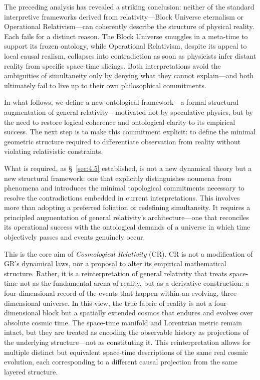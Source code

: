 \documentclass[12pt]{book}
\begin{document}
\vspace{4pt}

The preceding analysis has revealed a striking conclusion: neither of the standard interpretive frameworks derived from relativity---Block Universe eternalism or Operational Relativism---can coherently describe the structure of physical reality. Each fails for a distinct reason. The Block Universe smuggles in a meta-time to support its frozen ontology, while Operational Relativism, despite its appeal to local causal realism, collapses into contradiction as soon as physicists infer distant reality from specific space-time slicings. Both interpretations avoid the ambiguities of simultaneity only by denying what they cannot explain---and both ultimately fail to live up to their own philosophical commitments.

In what follows, we define a new ontological framework---a formal structural augmentation of general relativity---motivated not by speculative physics, but by the need to restore logical coherence and ontological clarity to its empirical success. The next step is to make this commitment explicit: to define the minimal geometric structure required to differentiate observation from reality without violating relativistic constraints.

What is required, as \S~\ref{sec:4.5} established, is not a new dynamical theory but a new structural framework: one that explicitly distinguishes noumena from phenomena and introduces the minimal topological commitments necessary to resolve the contradictions embedded in current interpretations. This involves more than adopting a preferred foliation or redefining simultaneity. It requires a principled augmentation of general relativity's architecture---one that reconciles its operational success with the ontological demands of a universe in which time objectively passes and events genuinely occur.

This is the core aim of \textit{Cosmological Relativity} (CR). CR is not a modification of GR's dynamical laws, nor a proposal to alter its empirical mathematical structure. Rather, it is a reinterpretation of general relativity that treats space-time not as the fundamental arena of reality, but as a derivative construction: a four-dimensional record of the events that happen within an evolving, three-dimensional universe. In this view, the true fabric of reality is not a four-dimensional block but a spatially extended cosmos that endures and evolves over absolute cosmic time. The space-time manifold and Lorentzian metric remain intact, but they are treated as encoding the observable history as projections of the underlying structure---not as constituting it. This reinterpretation allows for multiple distinct but equivalent space-time descriptions of the same real cosmic evolution, each corresponding to a different causal projection from the same layered structure.
\end{document}
